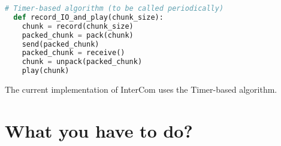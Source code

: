 \begin{lstlisting}[language=Python]
  # Timer-based algorithm (to be called periodically)
  def record_IO_and_play(chunk_size):
    chunk = record(chunk_size)
    packed_chunk = pack(chunk)
    send(packed_chunk)
    packed_chunk = receive()
    chunk = unpack(packed_chunk)
    play(chunk)
\end{lstlisting}


The current implementation of InterCom uses the Timer-based algorithm.

\section{What you have to do?}

